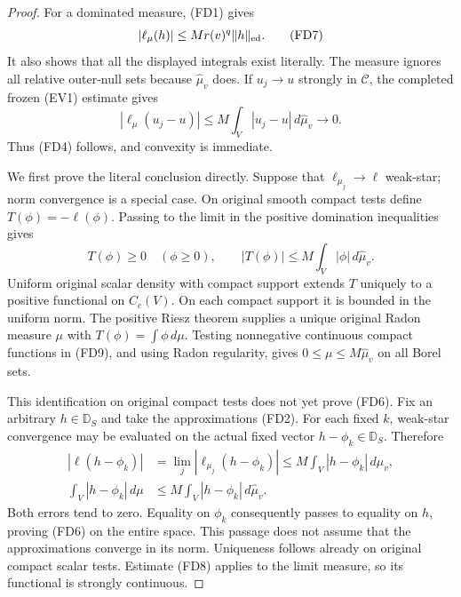 \begin{proof}
For a dominated measure, \textup{(FD1)} gives
\[
       |\ell_\mu(h)|\leq M r(v)^q\|h\|_{\rm ed}.
 \tag{FD7}
\]
It also shows that all the displayed integrals exist literally.
The measure ignores all relative outer-null sets because
$\widehat\mu_v$ does. If $u_j\to u$ strongly in $\mathscr C$,
the completed frozen \textup{(EV1)} estimate gives
\[
 |\ell_\mu(u_j-u)|
 \leq M\int_V|u_j-u|\,d\widehat\mu_v\longrightarrow0.
 \tag{FD8}
\]
Thus \textup{(FD4)} follows, and convexity is immediate.

We first prove the literal conclusion directly. Suppose that
$\ell_{\mu_j}\to\ell$ weak-star; norm convergence is a special
case. On original smooth compact tests define
$T(\phi)=-\ell(\phi)$. Passing to the limit in the positive
domination inequalities gives
\[
 T(\phi)\geq0\quad(\phi\geq0),\qquad
            |T(\phi)|\leq M\int_V|\phi|\,d\widehat\mu_v.
 \tag{FD9}
\]
Uniform original scalar density with compact support extends $T$
uniquely to a positive functional on $C_c(V)$. On each compact
support it is bounded in the uniform norm. The positive Riesz
theorem supplies a unique original Radon measure $\mu$ with
$T(\phi)=\int\phi\,d\mu$. Testing nonnegative continuous compact
functions in \textup{(FD9)}, and using Radon regularity, gives
$0\leq\mu\leq M\widehat\mu_v$ on all Borel sets.

This identification on original compact tests does not yet prove
\textup{(FD6)}. Fix an arbitrary $h\in\mathbb D_S$ and take
the approximations \textup{(FD2)}. For each fixed $k$, weak-star
convergence may be evaluated on the actual fixed vector
$h-\phi_k\in\mathbb D_S$. Therefore
\[
 \begin{split}
 |\ell(h-\phi_k)|
   &=\lim_j|\ell_{\mu_j}(h-\phi_k)|
       \leq M\int_V|h-\phi_k|\,d\widehat\mu_v,\\
 \int_V|h-\phi_k|\,d\mu
   &\leq M\int_V|h-\phi_k|\,d\widehat\mu_v.
 \end{split}
 \tag{FD10}
\]
Both errors tend to zero. Equality on $\phi_k$ consequently
passes to equality on $h$, proving \textup{(FD6)} on the entire
space. This passage does not assume that the approximations
converge in its norm. Uniqueness follows already on original
compact scalar tests. Estimate \textup{(FD8)} applies to the
limit measure, so its functional is strongly continuous.


\end{proof}
